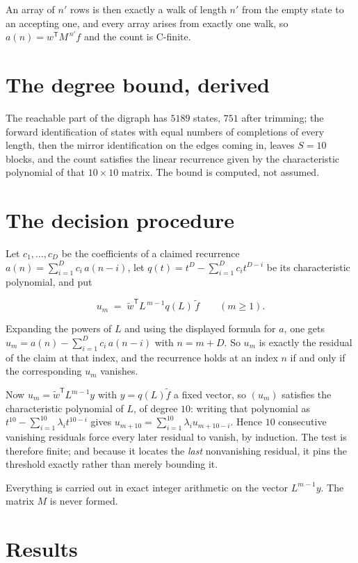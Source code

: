 \documentclass[11pt]{article}
\theoremstyle{definition}
\begin{document}
An array of $n'$ rows is then exactly a walk of length $n'$ from the empty state to an accepting one, and every array arises from exactly one walk, so $a(n) = w^{\mathsf T}M^{\,n'}f$ and the count is C-finite.

\section{The degree bound, derived}

The reachable part of the digraph has $5189$ states, $751$ after trimming; the forward identification of states with equal numbers of completions of every length, then the mirror identification on the edges coming in, leaves $S = 10$ blocks, and the count satisfies the linear recurrence given by the characteristic polynomial of that $10\times10$ matrix. The bound is computed, not assumed.

\section{The decision procedure}

Let $c_1,\dots,c_D$ be the coefficients of a claimed recurrence $a(n) = \sum_{i=1}^{D} c_i\,a(n-i)$, let $q(t) = t^{D} - \sum_{i=1}^{D} c_i t^{D-i}$ be its characteristic polynomial, and put

\[u_m \;=\; \tilde w^{\mathsf T} L^{\,m-1} q(L)\,\tilde f \qquad (m \ge 1).\]

Expanding the powers of $L$ and using the displayed formula for $a$, one gets $u_m = a(n) - \sum_{i=1}^{D} c_i\,a(n-i)$ with $n = m + D$. So $u_m$ is exactly the residual of the claim at that index, and the recurrence holds at an index $n$ if and only if the corresponding $u_m$ vanishes.

Now $u_m = \tilde w^{\mathsf T} L^{m-1} y$ with $y = q(L)\tilde f$ a fixed vector, so $(u_m)$ satisfies the characteristic polynomial of $L$, of degree $10$: writing that polynomial as $t^{10} - \sum_{i=1}^{10} \lambda_i t^{10-i}$ gives $u_{m+10} = \sum_{i=1}^{10} \lambda_i u_{m+10-i}$. Hence $10$ consecutive vanishing residuals force every later residual to vanish, by induction. The test is therefore finite; and because it locates the {\itshape last} nonvanishing residual, it pins the threshold exactly rather than merely bounding it.

Everything is carried out in exact integer arithmetic on the vector $L^{m-1}y$. The matrix $M$ is never formed.

\section{Results}
\end{document}
